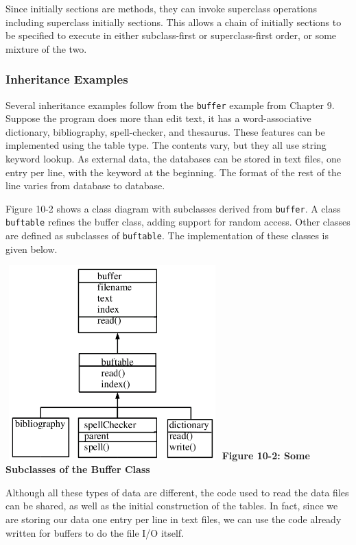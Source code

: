 Since initially sections are methods, they can invoke superclass
operations including superclass initially sections. This allows a chain
of initially sections to be specified to execute in either
subclass-first or superclass-first order, or some mixture of the two. 

\subsubsection[Inheritance Examples]{Inheritance Examples}

Several inheritance examples follow from the \texttt{buffer}
example from Chapter 9. Suppose the program does more than
edit text, it has a word-associative
dictionary, bibliography, spell-checker, and thesaurus. These
features can be implemented using the table type.
The contents vary, but they all use string
keyword lookup. As external data, the databases can be stored in text
files, one entry per line, with the keyword at the beginning. The
format of the rest of the line varies from database to database.

Figure 10-2 shows a class diagram with subclasses derived from
\texttt{buffer}. A class \texttt{buftable} refines the
buffer class, adding support for random access. Other classes are
defined as subclasses of \texttt{buftable}. The implementation of these
classes is given below.


\begin{center}
\includegraphics[width=3.24in,height=2.95in]{ub-img/ub-img43.png}
\linebreak
{\sffamily\bfseries Figure 10-2: Some Subclasses of the Buffer Class}
\end{center}

\bigskip

Although all these types of data are different, the code used to read
the data files can be shared, as well as the initial construction of
the tables. In fact, since we are storing our data one entry per line
in text files, we can use the code already written for buffers to do
the file I/O itself. 

